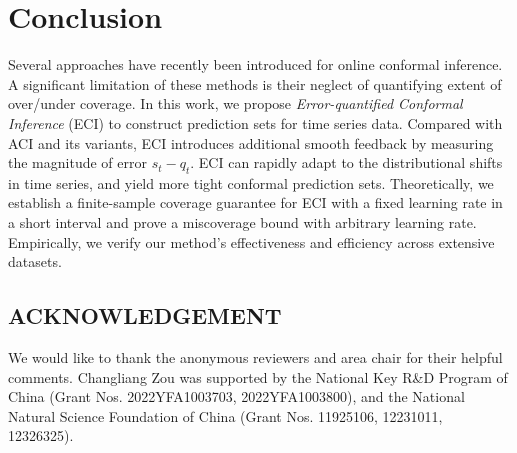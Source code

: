 \vspace{-1em}
\section{Conclusion}
\vspace{-0.5em}
Several approaches have recently been introduced for online conformal inference. A significant limitation of these methods is their neglect of quantifying extent of over/under coverage. In this work, we propose \textit{Error-quantified Conformal Inference} (ECI) to construct prediction sets for time series data. Compared with ACI \citep{aci_gibbs2021adaptive} and its variants, ECI introduces additional smooth feedback by measuring the magnitude of error $s_t - q_t$. ECI can rapidly adapt to the distributional shifts in time series, and yield more tight conformal prediction sets. Theoretically, we establish a finite-sample coverage guarantee for ECI with a fixed learning rate in a short interval and prove a miscoverage bound with arbitrary learning rate. Empirically, we verify our method's effectiveness and efficiency across extensive datasets.



\subsection*{ACKNOWLEDGEMENT}
We would like to thank the anonymous reviewers and area chair for their helpful comments. Changliang Zou was supported by the National Key R\&D Program of China (Grant Nos. 2022YFA1003703, 2022YFA1003800), and the National Natural Science Foundation of China (Grant Nos. 11925106, 12231011, 12326325).